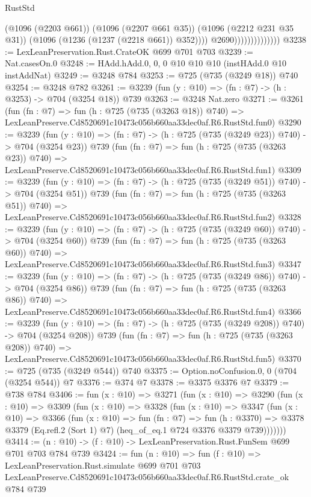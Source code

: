 \begin{lexlean}{RustStd}
\begin{coremodule}
                                    (@1096 (@2203 @661))
                                    (@1096 (@2207 @661 @35))
                                    (@1096 (@2212 @231 @35 @31))
                                    (@1096 (@1236 (@1237 (@2218 @661)) @352))))
                                @2690))))))))))))))
@3238 := LexLeanPreservation.Rust.CrateOK @699 @701 @703
@3239 := Nat.casesOn.{0}
@3248 := HAdd.hAdd.{0, 0, 0} @10 @10 @10 (instHAdd.{0} @10 instAddNat)
@3249 := @3248 @784
@3253 := @725 (@735 (@3249 @18)) @740
@3254 := @3248 @782
@3261 := @3239 (fun (y : @10) => (fn : @7) -> (h : @3253) -> @704 (@3254 @18)) @739
@3263 := @3248 Nat.zero
@3271 := @3261
    (fun (fn : @7) =>
    fun (h : @725 (@735 (@3263 @18)) @740) =>
    LexLeanPreserve.Cd8520691c10473c056b660aa33dec0af.R6.RustStd.fun0)
@3290 := @3239
    (fun (y : @10) => (fn : @7) -> (h : @725 (@735 (@3249 @23)) @740) -> @704 (@3254 @23))
    @739
    (fun (fn : @7) =>
    fun (h : @725 (@735 (@3263 @23)) @740) =>
    LexLeanPreserve.Cd8520691c10473c056b660aa33dec0af.R6.RustStd.fun1)
@3309 := @3239
    (fun (y : @10) => (fn : @7) -> (h : @725 (@735 (@3249 @51)) @740) -> @704 (@3254 @51))
    @739
    (fun (fn : @7) =>
    fun (h : @725 (@735 (@3263 @51)) @740) =>
    LexLeanPreserve.Cd8520691c10473c056b660aa33dec0af.R6.RustStd.fun2)
@3328 := @3239
    (fun (y : @10) => (fn : @7) -> (h : @725 (@735 (@3249 @60)) @740) -> @704 (@3254 @60))
    @739
    (fun (fn : @7) =>
    fun (h : @725 (@735 (@3263 @60)) @740) =>
    LexLeanPreserve.Cd8520691c10473c056b660aa33dec0af.R6.RustStd.fun3)
@3347 := @3239
    (fun (y : @10) => (fn : @7) -> (h : @725 (@735 (@3249 @86)) @740) -> @704 (@3254 @86))
    @739
    (fun (fn : @7) =>
    fun (h : @725 (@735 (@3263 @86)) @740) =>
    LexLeanPreserve.Cd8520691c10473c056b660aa33dec0af.R6.RustStd.fun4)
@3366 := @3239
    (fun (y : @10) => (fn : @7) -> (h : @725 (@735 (@3249 @208)) @740) -> @704 (@3254 @208))
    @739
    (fun (fn : @7) =>
    fun (h : @725 (@735 (@3263 @208)) @740) =>
    LexLeanPreserve.Cd8520691c10473c056b660aa33dec0af.R6.RustStd.fun5)
@3370 := @725 (@735 (@3249 @544)) @740
@3375 := Option.noConfusion.{0, 0} (@704 (@3254 @544)) @7
@3376 := @374 @7
@3378 := @3375 @3376 @7
@3379 := @738 @784
@3406 := fun (x : @10) =>
  @3271
    (fun (x : @10) =>
    @3290
      (fun (x : @10) =>
      @3309
        (fun (x : @10) =>
        @3328
          (fun (x : @10) =>
          @3347
            (fun (x : @10) =>
            @3366
              (fun (x : @10) =>
              fun (fn : @7) =>
              fun (h : @3370) =>
              @3378 @3379 (Eq.refl.{2} (Sort 1) @7) (heq_of_eq.{1} @724 @3376 @3379 @739)))))))
@3414 := (n : @10) -> (f : @10) -> LexLeanPreservation.Rust.FunSem @699 @701 @703 @784 @739
@3424 := fun (n : @10) =>
  fun (f : @10) =>
  LexLeanPreservation.Rust.simulate
    @699
    @701
    @703
    LexLeanPreserve.Cd8520691c10473c056b660aa33dec0af.R6.RustStd.crate_ok
    @784
    @739
\end{coremodule}
\end{lexlean}
